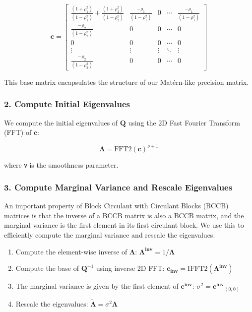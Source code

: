 \documentclass[
  letterpaper,
  DIV=11,
  numbers=noendperiod]{scrartcl}
\providecommand{\tightlist}{%
  \setlength{\itemsep}{0pt}\setlength{\parskip}{0pt}}\usepackage{longtable,booktabs,array}
\begin{document}
\[
\mathbf{c} = \begin{bmatrix}
\frac{(1+\rho_1^2)}{(1 - \rho_1^2)} + \frac{(1+\rho_2^2)}{(1 - \rho_2^2)} & \frac{-\rho_1}{(1 - \rho_1^2)} & 0 & \cdots  & \frac{-\rho_1}{(1 - \rho_1^2)} \\
\frac{-\rho_2}{(1 - \rho_2^2)} & 0 & 0 & \cdots  & 0 \\
0 & 0 & 0 & \cdots  & 0 \\
\vdots & \vdots & \vdots & \ddots &  \vdots \\
\frac{-\rho_2}{(1 - \rho_2^2)} & 0 & 0 & \cdots  & 0
\end{bmatrix}
\]

This base matrix encapsulates the structure of our Matérn-like precision
matrix.

\subsubsection{2. Compute Initial
Eigenvalues}\label{compute-initial-eigenvalues}

We compute the initial eigenvalues of \(\mathbf Q\) using the 2D Fast
Fourier Transform (FFT) of \(\mathbf c\):

\[
\boldsymbol{\Lambda} = \text{FFT2}(\mathbf{c})^{\nu+1}
\]

where ν is the smoothness parameter.

\subsubsection{3. Compute Marginal Variance and Rescale
Eigenvalues}\label{compute-marginal-variance-and-rescale-eigenvalues}

An important property of Block Circulant with Circulant Blocks (BCCB)
matrices is that the inverse of a BCCB matrix is also a BCCB matrix, and
the marginal variance is the first element in its first circulant block.
We use this to efficiently compute the marginal variance and rescale the
eigenvalues:

\begin{enumerate}
\def\labelenumi{\alph{enumi}.}
\tightlist
\item
  Compute the element-wise inverse of \(\boldsymbol{\Lambda}\):
  \(\mathbf{\Lambda^{inv}} = 1 / \boldsymbol{\Lambda}\)
\item
  Compute the base of \(\mathbf Q^{-1}\) using inverse 2D FFT:
  \(\mathbf{c_{inv}} = \text{IFFT2}(\mathbf{{\Lambda^{inv}}})\)
\item
  The marginal variance is given by the first element of
  \(\mathbf{c^{inv}}\): \(\sigma^2 = \mathbf{c^{inv}}_{(0,0)}\)
\item
  Rescale the eigenvalues:
  \(\boldsymbol{\widetilde \Lambda} = \sigma^2 \boldsymbol{\Lambda}\)
\end{enumerate}
\end{document}
